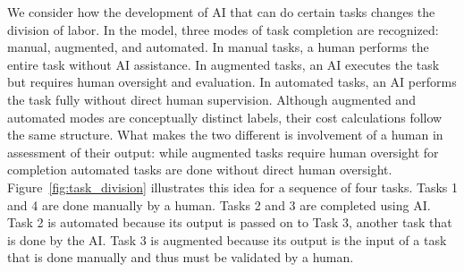 \documentclass{article}
\theoremstyle{plain}
\theoremstyle{plain}
\begin{document}
We consider how the development of AI that can do certain tasks changes the division of labor.  
In the model, three modes of task completion are recognized: manual, augmented, and automated.  
In manual tasks, a human performs the entire task without AI assistance.  
In augmented tasks, an AI executes the task but requires human oversight and evaluation.  
In automated tasks, an AI performs the task fully without direct human supervision.  
Although augmented and automated modes are conceptually distinct labels, their cost calculations follow the same structure.
What makes the two different is involvement of a human in assessment of their output: while augmented tasks require human oversight for completion automated tasks are done without direct human oversight.  
Figure~\ref{fig:task_division} illustrates this idea for a sequence of four tasks.  
Tasks 1 and 4 are done manually by a human.
Tasks 2 and 3 are completed using AI.  
Task 2 is automated because its output is passed on to Task 3, another task that is done by the AI.  
Task 3 is augmented because its output is the input of a task that is done manually and thus must be validated by a human.
\end{document}
